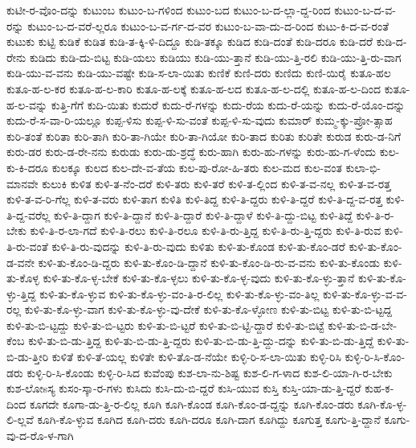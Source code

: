 {ಕುಟೀ-ರ-ವೊಂ-ದನ್ನು
ಕುಟುಂಬ
ಕುಟುಂ-ಬ-ಗಳಿಂದ
ಕುಟುಂ-ಬದ
ಕುಟುಂ-ಬ-ದ-ಲ್ಲಾ-ದ್ದ-ರಿಂದ
ಕುಟುಂ-ಬ-ದ-ವ-ರನ್ನು
ಕುಟುಂ-ಬ-ದ-ವರೆ-ಲ್ಲರೂ
ಕುಟುಂ-ಬ-ವ-ರ್ಗ-ದ-ವರ
ಕುಟುಂ-ಬ-ವಾ-ದು-ದ-ರಿಂದ
ಕುಟು-ಕಿ-ದ-ವ-ರಂತೆ
ಕುಟುಕು
ಕುಟ್ಟಿ
ಕುಡಿಕೆ
ಕುಡಿತ
ಕುಡಿ-ತ-ಕ್ಕಿ-ಳಿ-ದಿದ್ದೂ
ಕುಡಿ-ತಕ್ಕೂ
ಕುಡಿದ
ಕುಡಿ-ದಂತೆ
ಕುಡಿ-ದರೂ
ಕುಡಿ-ದರೆ
ಕುಡಿ-ದ-ರೇನು
ಕುಡಿದು
ಕುಡಿ-ದು-ಬಿಟ್ಟ
ಕುಡಿ-ಯಲು
ಕುಡಿಯು
ಕುಡಿ-ಯು-ತ್ತಾನೆ
ಕುಡಿ-ಯು-ತ್ತಿ-ರಲಿ
ಕುಡಿ-ಯು-ತ್ತಿ-ರು-ವಾಗ
ಕುಡಿ-ಯು-ವ-ವನು
ಕುಡಿ-ಯು-ವಷ್ಟೇ
ಕುಡಿ-ಸ-ಲಾ-ಯಿತು
ಕುಣಿಕೆ
ಕುಣಿ-ದರು
ಕುಣಿದು
ಕುಣಿ-ಯಿರೈ
ಕುತೂ-ಹಲ
ಕುತೂ-ಹ-ಲ-ಕರ
ಕುತೂ-ಹ-ಲ-ಕಾರಿ
ಕುತೂ-ಹ-ಲಕ್ಕೆ
ಕುತೂ-ಹ-ಲದ
ಕುತೂ-ಹ-ಲ-ದಲ್ಲಿ
ಕುತೂ-ಹ-ಲ-ದಿಂದ
ಕುತೂ-ಹ-ಲ-ವನ್ನು
ಕುತ್ತಿ-ಗೆಗೆ
ಕುದಿ-ಯಿತು
ಕುದುರೆ
ಕುದು-ರೆ-ಗಳನ್ನು
ಕುದು-ರೆಯ
ಕುದು-ರೆ-ಯನ್ನು
ಕುದು-ರೆ-ಯೊಂ-ದನ್ನು
ಕುದು-ರೆ-ಸ-ವಾ-ರಿ-ಯಲ್ಲೂ
ಕುಪ್ಪ-ಳಿಸು
ಕುಪ್ಪ-ಳಿ-ಸು-ವಂತೆ
ಕುಪ್ಪ-ಳಿ-ಸು-ವುದು
ಕುಮಾರ್
ಕುಮ್ಮ-ಕ್ಕು-ಪ್ರೋ-ತ್ಸಾಹ
ಕುರಿ-ತಂತೆ
ಕುರಿತಾ
ಕುರಿ-ತಾಗಿ
ಕುರಿ-ತಾ-ಗಿಯೇ
ಕುರಿ-ತಾ-ಗಿಯೋ
ಕುರಿ-ತಾದ
ಕುರಿತು
ಕುರಿತೇ
ಕುರುಡ
ಕುರು-ಡ-ನಿಗೆ
ಕುರು-ಡರ
ಕುರು-ಡ-ರೇ-ನನು
ಕುರುಡು
ಕುರು-ಡು-ಶ್ರದ್ಧೆ
ಕುರು-ಹಾಗಿ
ಕುರು-ಹು-ಗಳನ್ನು
ಕುರು-ಹು-ಗ-ಳೆಂದು
ಕುಲ-ಕು-ಕಿ-ದರೂ
ಕುಲಕ್ಕೂ
ಕುಲದ
ಕುಲ-ದೇ-ವ-ತೆಯ
ಕುಲ-ಪು-ರೋ-ಹಿ-ತರು
ಕುಲ-ಮದ
ಕುಲ-ವಂತ
ಕುಲಾ-ಭಿ-ಮಾನವೇ
ಕುಲುಕಿ
ಕುಳಿತ
ಕುಳಿ-ತ-ನೆಂ-ದರೆ
ಕುಳಿ-ತರು
ಕುಳಿ-ತರೆ
ಕುಳಿ-ತ-ಲ್ಲಿಂದ
ಕುಳಿ-ತ-ವ-ನಲ್ಲ
ಕುಳಿ-ತ-ವ-ರತ್ತ
ಕುಳಿ-ತ-ವ-ರಿ-ಗೆಲ್ಲ
ಕುಳಿ-ತ-ವರು
ಕುಳಿ-ತಾಗ
ಕುಳಿತಿ
ಕುಳಿ-ತಿದ್ದ
ಕುಳಿ-ತಿ-ದ್ದರು
ಕುಳಿ-ತಿ-ದ್ದರೆ
ಕುಳಿ-ತಿ-ದ್ದ-ವ-ರತ್ತ
ಕುಳಿ-ತಿ-ದ್ದ-ವರೆಲ್ಲ
ಕುಳಿ-ತಿ-ದ್ದಾಗ
ಕುಳಿ-ತಿ-ದ್ದಾನೆ
ಕುಳಿ-ತಿ-ದ್ದಾರೆ
ಕುಳಿ-ತಿ-ದ್ದಾಳೆ
ಕುಳಿ-ತಿ-ದ್ದು-ಬಿಟ್ಟ
ಕುಳಿ-ತಿದ್ದೆ
ಕುಳಿ-ತಿ-ರ-ಬೇಕು
ಕುಳಿ-ತಿ-ರ-ಲಾ-ಗದೆ
ಕುಳಿ-ತಿ-ರಲು
ಕುಳಿ-ತಿ-ರಲೂ
ಕುಳಿ-ತಿ-ರು-ತ್ತಿದ್ದ
ಕುಳಿ-ತಿ-ರು-ತ್ತಿ-ದ್ದರು
ಕುಳಿ-ತಿ-ರುವ
ಕುಳಿ-ತಿ-ರು-ವಂತೆ
ಕುಳಿ-ತಿ-ರು-ವುದನ್ನು
ಕುಳಿ-ತಿ-ರು-ವುದು
ಕುಳಿತು
ಕುಳಿ-ತು-ಕೊಂಡ
ಕುಳಿ-ತು-ಕೊಂ-ಡರೆ
ಕುಳಿ-ತು-ಕೊಂ-ಡ-ವನೇ
ಕುಳಿ-ತು-ಕೊಂ-ಡಿ-ದ್ದರು
ಕುಳಿ-ತು-ಕೊಂ-ಡಿ-ದ್ದಾನೆ
ಕುಳಿ-ತು-ಕೊಂ-ಡಿ-ರು-ವ-ವನು
ಕುಳಿ-ತು-ಕೊಂಡು
ಕುಳಿ-ತು-ಕೊಳ್ಳ
ಕುಳಿ-ತು-ಕೊ-ಳ್ಳ-ಬೇಕೆ
ಕುಳಿ-ತು-ಕೊ-ಳ್ಳಲು
ಕುಳಿ-ತು-ಕೊ-ಳ್ಳ-ವುದು
ಕುಳಿ-ತು-ಕೊ-ಳ್ಳು-ತ್ತಾನೆ
ಕುಳಿ-ತು-ಕೊ-ಳ್ಳು-ತ್ತಿದ್ದ
ಕುಳಿ-ತು-ಕೊ-ಳ್ಳುವ
ಕುಳಿ-ತು-ಕೊ-ಳ್ಳು-ವಂ-ತಿ-ರ-ಲಿಲ್ಲ
ಕುಳಿ-ತು-ಕೊ-ಳ್ಳು-ವಂ-ತಿಲ್ಲ
ಕುಳಿ-ತು-ಕೊ-ಳ್ಳು-ವ-ವ-ರಲ್ಲ
ಕುಳಿ-ತು-ಕೊ-ಳ್ಳು-ವಾಗ
ಕುಳಿ-ತು-ಕೊ-ಳ್ಳು-ವು-ದೇಕೆ
ಕುಳಿ-ತು-ಕೊ-ಳ್ಳೋಣ
ಕುಳಿ-ತು-ಬಿಟ್ಟ
ಕುಳಿ-ತು-ಬಿ-ಟ್ಟದ್ದ
ಕುಳಿ-ತು-ಬಿ-ಟ್ಟದ್ದು
ಕುಳಿ-ತು-ಬಿ-ಟ್ಟರು
ಕುಳಿ-ತು-ಬಿ-ಟ್ಟರೆ
ಕುಳಿ-ತು-ಬಿ-ಟ್ಟಿ-ದ್ದಾರೆ
ಕುಳಿ-ತು-ಬಿಟ್ಟೆ
ಕುಳಿ-ತು-ಬಿ-ಡ-ಬೇ-ಕೆಂಬ
ಕುಳಿ-ತು-ಬಿ-ಡು-ತ್ತಿದ್ದ
ಕುಳಿ-ತು-ಬಿ-ಡು-ತ್ತಿ-ದ್ದರು
ಕುಳಿ-ತು-ಬಿ-ಡು-ತ್ತಿ-ದ್ದು-ದನ್ನು
ಕುಳಿ-ತು-ಬಿ-ಡು-ತ್ತಿದ್ದೆ
ಕುಳಿ-ತು-ಬಿ-ಡು-ತ್ತೀರಿ
ಕುಳಿತೆ
ಕುಳಿ-ತೆ-ಯಲ್ಲ
ಕುಳಿತೇ
ಕುಳಿ-ತೊ-ಡ-ನೆಯೇ
ಕುಳ್ಳಿ-ರಿ-ಸ-ಲಾ-ಯಿತು
ಕುಳ್ಳಿ-ರಿಸಿ
ಕುಳ್ಳಿ-ರಿ-ಸಿ-ಕೊಂ-ಡರು
ಕುಳ್ಳಿ-ರಿ-ಸಿ-ಕೊಂಡು
ಕುಳ್ಳಿ-ರಿ-ಸಿದ
ಕುವೆಂಪು
ಕುಶ-ಲಾ-ನು-ಶಿಷ್ಟ
ಕುಶ-ಲಿ-ಗ-ಳಾದ
ಕುಶ-ಲಿ-ಯಾ-ಗಿ-ರ-ಬೇಕು
ಕುಶ-ಲೋsಸ್ಯ
ಕುಸಂ-ಸ್ಕಾ-ರ-ಗಳು
ಕುಸಿದು
ಕುಸಿ-ದು-ಬಿ-ದ್ದರೆ
ಕುಸಿ-ಯುವ
ಕುಸ್ತಿ
ಕುಸ್ತಿ-ಯಾ-ಡು-ತ್ತಿ-ದ್ದರೆ
ಕುಹ-ಕ-ದಿಂದ
ಕೂಗದೇ
ಕೂಗಾ-ಡು-ತ್ತಿ-ರ-ಲಿಲ್ಲ
ಕೂಗಿ
ಕೂಗಿ-ಕೊಂಡ
ಕೂಗಿ-ಕೊಂ-ಡ-ದ್ದನ್ನು
ಕೂಗಿ-ಕೊಂ-ಡರು
ಕೂಗಿ-ಕೊ-ಳ್ಳ-ಲಿ-ಲ್ಲವೆ
ಕೂಗಿ-ಕೊ-ಳ್ಳುವ
ಕೂಗಿದ
ಕೂಗಿ-ದರು
ಕೂಗಿ-ದರೂ
ಕೂಗಿ-ದಾಗ
ಕೂಗಿದ್ದು
ಕೂಗುತ್ತ
ಕೂಗು-ತ್ತಿ-ದ್ದಾನೆ
ಕೂಗು-ವು-ದ-ರೊ-ಳ-ಗಾಗಿ
}
